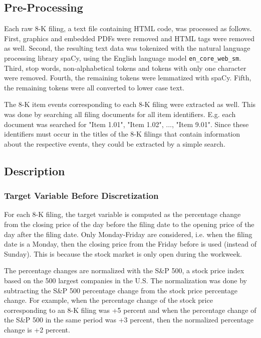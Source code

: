 \documentclass{article}
\begin{document}
	\subsection{Pre-Processing}
	
	Each raw 8-K filing, a text file containing HTML code, was processed as follows. First, graphics and embedded PDFs were removed and HTML tags were removed as well. Second, the resulting text data was tokenized with the natural language processing library spaCy, using the English language model \lstinline{en_core_web_sm}. Third, stop words, non-alphabetical tokens and tokens with only one character were removed. Fourth, the remaining tokens were lemmatized with spaCy. Fifth, the remaining tokens were all converted to lower case text.
	
	The 8-K item events corresponding to each 8-K filing were extracted as well. This was done by searching all filing documents for all item identifiers. E.g. each document was searched for "Item 1.01", "Item 1.02", ..., "Item 9.01". Since these identifiers must occur in the titles of the 8-K filings that contain information about the respective events, they could be extracted by a simple search. 
	
	\subsection{Description}
	
	
	\subsubsection{Target Variable Before Discretization}
	
	For each 8-K filing, the target variable is computed as the percentage change from the closing price of the day before the filing date to the opening price of the day after the filing date. Only Monday-Friday are considered, i.e. when the filing date is a Monday, then the closing price from the Friday before is used (instead of Sunday). This is because the stock market is only open during the workweek.
	
	The percentage changes are normalized with the S\&P 500, a stock price index based on the 500 largest companies in the U.S. The normalization was done by subtracting the S\&P 500 percentage change from the stock price percentage change. For example, when the percentage change of the stock price corresponding to an 8-K filing was +5 percent and when the percentage change of the S\&P 500 in the same period was +3 percent, then the normalized percentage change is +2 percent.
	
\end{document}
